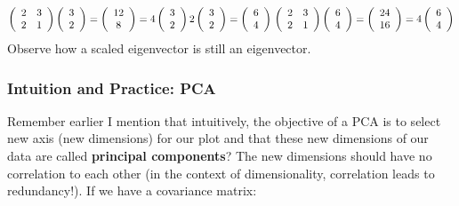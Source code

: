 \documentclass[]{article}
\begin{document}
\[
\left(\begin{array}{cc} 
2 & 3\\ 
2 & 1 
\end{array}\right)
\left(\begin{array}{cc} 
3\\ 
2
\end{array}\right)
=
\left(\begin{array}{cc} 
12\\ 
8
\end{array}\right)
=4
\left(\begin{array}{cc} 
3\\ 
2
\end{array}\right)
\\
2\left(\begin{array}{cc} 
3\\ 
2
\end{array}\right) = \left(\begin{array}{cc} 
6\\ 
4
\end{array}\right) \\
\left(\begin{array}{cc} 
2 & 3\\ 
2 & 1 
\end{array}\right)
\left(\begin{array}{cc} 
6\\ 
4
\end{array}\right)
=\left(\begin{array}{cc} 
24\\ 
16
\end{array}\right)
=4
\left(\begin{array}{cc} 
6\\ 
4
\end{array}\right)
\] Observe how a scaled eigenvector is still an eigenvector.

\hypertarget{intuition-and-practice-pca}{%
\subsubsection{Intuition and Practice:
PCA}\label{intuition-and-practice-pca}}

Remember earlier I mention that intuitively, the objective of a PCA is
to select new axis (new dimensions) for our plot and that these new
dimensions of our data are called \textbf{principal components}? The new
dimensions should have no correlation to each other (in the context of
dimensionality, correlation leads to redundancy!). If we have a
covariance matrix:
\end{document}
